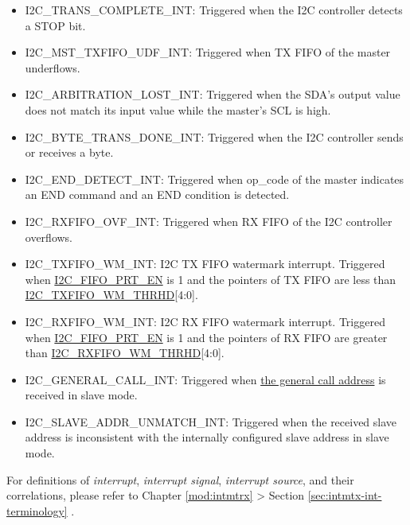 \documentclass[main\_\_EN.tex]{subfiles}
\begin{document}
\begin{itemize}
\item \label{int:i2c-trans-complete}I2C\_TRANS\_COMPLETE\_INT: Triggered when the I2C controller detects a STOP bit.
\item \label{int:i2c-mst-txfifo-udf}I2C\_MST\_TXFIFO\_UDF\_INT: Triggered when TX FIFO of the master underflows.
\item \label{int:i2c-arbitration-lost}I2C\_ARBITRATION\_LOST\_INT: Triggered when the SDA's output value does not match its input value while the master's SCL is high.
\item \label{int:i2c-byte-trans-done}I2C\_BYTE\_TRANS\_DONE\_INT: Triggered when the I2C controller sends or receives a byte.
\item \label{int:i2c-end}I2C\_END\_DETECT\_INT: Triggered when op\_code of the master indicates an END command and an END condition is detected.
\item \label{int:i2c-rxfifo-ovf}I2C\_RXFIFO\_OVF\_INT: Triggered when RX FIFO of the I2C controller overflows.
\item \label{int:i2c-txfifo-wm}I2C\_TXFIFO\_WM\_INT: I2C TX FIFO watermark interrupt. Triggered when \hyperref[fielddesc:I2CFIFOPRTEN]{I2C\_FIFO\_PRT\_EN} is 1 and the pointers of TX FIFO are less than \hyperref[fielddesc:I2CTXFIFOWMTHRHD]{I2C\_TXFIFO\_WM\_THRHD}[4:0].
\item \label{int:i2c-rxfifo-wm}I2C\_RXFIFO\_WM\_INT: I2C RX FIFO watermark interrupt. Triggered when \hyperref[fielddesc:I2CFIFOPRTEN]{I2C\_FIFO\_PRT\_EN} is 1 and the pointers of RX FIFO are greater than \hyperref[fielddesc:I2CRXFIFOWMTHRHD]{I2C\_RXFIFO\_WM\_THRHD}[4:0].
\item \label{int:i2c-general-call}I2C\_GENERAL\_CALL\_INT: Triggered when \href{https://www.csd.uoc.gr/~hy428/reading/i2c_spec.pdf#page=16}{the general call address} is received in slave mode.
\item \label{int:i2c-slave-addr-unmatch}I2C\_SLAVE\_ADDR\_UNMATCH\_INT: Triggered when the received slave address is inconsistent with the internally configured slave address in slave mode.
\end{itemize}

\begin{tiplisting}
For definitions of \textit{interrupt}, \textit{interrupt signal}, \textit{interrupt source}, and their correlations, please refer to Chapter \ref{mod:intmtrx} \textit{} > Section \ref{sec:intmtx-int-terminology} \textit{}.
\end{tiplisting}
\end{document}
